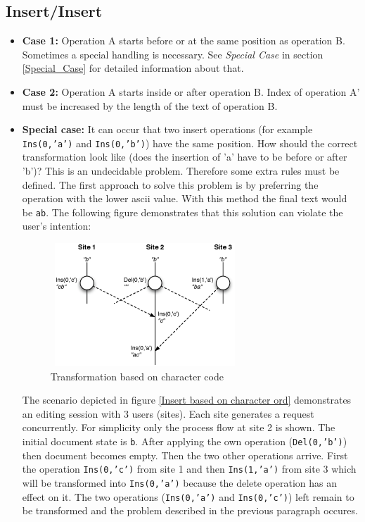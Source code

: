 \subsection{Insert/Insert}
\begin{itemize}
\item \textbf{Case 1:}
Operation A starts before or at the same position as operation B. Sometimes a special handling is necessary. See \emph{Special Case} in section \ref{Special_Case} for detailed information about that.
\item \textbf{Case 2:}
Operation A starts inside or after operation B. Index of operation A' must be increased by the length of the text of operation B.
\item \textbf{Special case:}
\label{Special_Case}
It can occur that two insert operations (for example \texttt{Ins(0,'a')} and \texttt{Ins(0,'b')}) have the same position. How should the correct transformation look like (does the insertion of 'a' have to be before or after 'b')? This is an undecidable problem. Therefore some extra rules must be defined. The first approach to solve this problem is by preferring the operation with the lower ascii value. With this method the final text would be \texttt{ab}. The following figure demonstrates that this solution can violate the user's intention:
\begin{figure}[H]
\centering
\includegraphics[height=4.63cm,width=7.12cm]{../../images/algo-impl/transform_ins_ins_charpos.eps}
\caption{Transformation based on character code}
\label{Transformation based on character code}
\end{figure}
The scenario depicted in figure \ref{Insert based on character ord} demonstrates an editing session with 3 users (sites). Each site generates a request concurrently. For simplicity only the process flow at site 2 is shown. The initial document state is \texttt{b}. After applying the own operation (\texttt{Del(0,'b')}) then document becomes empty. Then the two other operations arrive. First the operation \texttt{Ins(0,'c')} from site 1 and then \texttt{Ins(1,'a')} from site 3 which will be transformed into \texttt{Ins(0,'a')} because the delete operation has an effect on it. The two operations (\texttt{Ins(0,'a')} and \texttt{Ins(0,'c')}) left remain to be transformed and the problem described in the previous paragraph occures.


\end{itemize}
